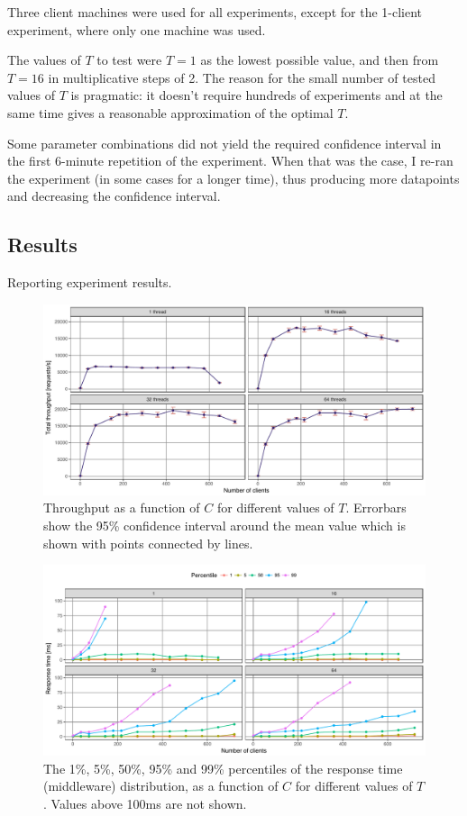 \documentclass[11pt]{article}
\begin{document}
Three client machines were used for all experiments, except for the 1-client experiment, where only one machine was used.

The values of $T$ to test were $T=1$ as the lowest possible value, and then from $T=16$ in multiplicative steps of 2. The reason for the small number of tested values of $T$ is pragmatic: it doesn't require hundreds of experiments and at the same time gives a reasonable approximation of the optimal $T$.

Some parameter combinations did not yield the required confidence interval in the first 6-minute repetition of the experiment. When that was the case, I re-ran the experiment (in some cases for a longer time), thus producing more datapoints and decreasing the confidence interval.

\subsection{Results}
Reporting experiment results.

\begin{figure}[h]
\centering
\includegraphics[width=\textwidth]{../results/throughput/graphs/tp_vs_clients.pdf}
\caption{Throughput as a function of $C$ for different values of $T$. Errorbars show the 95\% confidence interval around the mean value which is shown with points connected by lines.}
\label{fig:exp1:res:throughput}
\end{figure}

\begin{figure}[h]
\centering
\includegraphics[width=\textwidth]{../results/throughput/graphs/response_time_vs_clients.pdf}
\caption{The 1\%, 5\%, 50\%, 95\% and 99\% percentiles of the response time (middleware) distribution, as a function of $C$ for different values of $T$. Values above 100ms are not shown.}
\label{fig:exp1:res:responsetime}
\end{figure}
\end{document}
